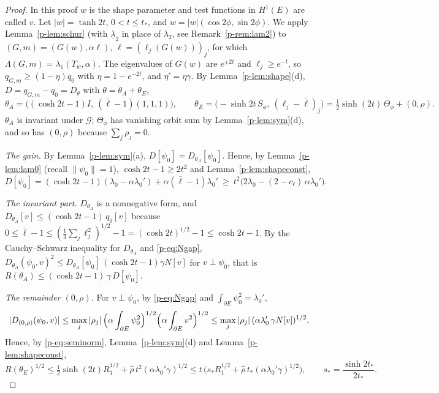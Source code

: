 \documentclass[11pt]{article}
\theoremstyle{remark}
\begin{document}
\begin{proof}
In this proof $w$ is the shape parameter and test functions in $H^1(E)$ are called $v$.
Let $|w|=\tanh2t$, $0<t\le t_*$, and $w=|w|(\cos2\phi,\sin2\phi)$. We apply
Lemma~\ref{p-lem:schur} (with $\underline\lambda_2$ in place of $\lambda_2$, see
Remark~\ref{p-rem:lam2}) to $(G,m)=(G(w),\alpha\ell)$, $\ell=(\ell_j(G(w)))_j$, for which
$\Lambda(G,m)=\lambda_1(T_w,\alpha)$. The eigenvalues of $G(w)$ are $e^{\pm2t}$ and
$\ell_j\ge e^{-t}$, so $q_{G,m}\ge(1-\eta)q_0$ with $\eta=1-e^{-2t}$, and $\eta'=\eta\gamma$.
By Lemma~\ref{p-lem:shape}(d), $D=q_{G,m}-q_0=D_\theta$ with $\theta=\theta_A+\theta_E$,
\[
  \theta_A=\bigl((\cosh2t-1)I,\ (\bar\ell-1)(1,1,1)\bigr),\qquad
  \theta_E=\bigl(-\sinh2t\,S_\phi,\ (\ell_j-\bar\ell)_j\bigr)
  =\tfrac12\sinh(2t)\,\Theta_\phi+(0,\rho).
\]
$\theta_A$ is invariant under $\mathcal G$; $\Theta_\phi$ has vanishing orbit sum by
Lemma~\ref{p-lem:sym}(d), and so has $(0,\rho)$ because $\sum_j\rho_j=0$.

\emph{The gain.} By Lemma~\ref{p-lem:sym}(a), $D[\psi_0]=D_{\theta_A}[\psi_0]$. Hence, by
Lemma~\ref{p-lem:lam0} (recall $\|\psi_0\|=1$), $\cosh2t-1\ge2t^2$ and Lemma~\ref{p-lem:shapeconst},
\begin{equation}\label{p-eq:gain}
  D[\psi_0]=(\cosh2t-1)(\lambda_0-\alpha\lambda_0')+\alpha(\bar\ell-1)\lambda_0'
  \ \ge\ t^2\bigl(2\lambda_0-(2-c_\ell)\,\alpha\lambda_0'\bigr).
\end{equation}

\emph{The invariant part.} $D_{\theta_A}$ is a nonnegative form, and
$D_{\theta_A}[v]\le(\cosh2t-1)\,q_0[v]$ because
$0\le\bar\ell-1\le(\frac13\sum_j\ell_j^2)^{1/2}-1=(\cosh2t)^{1/2}-1\le\cosh2t-1$. By the
Cauchy--Schwarz inequality for $D_{\theta_A}$ and \eqref{p-eq:Ngap},
$D_{\theta_A}(\psi_0,v)^2\le D_{\theta_A}[\psi_0]\,(\cosh2t-1)\gamma N[v]$ for $v\perp\psi_0$, that is
$R(\theta_A)\le(\cosh2t-1)\,\gamma\,D[\psi_0]$.

\emph{The remainder $(0,\rho)$.} For $v\perp\psi_0$, by \eqref{p-eq:Ngap} and
$\int_{\partial E}\psi_0^2=\lambda_0'$,
\[
  |D_{(0,\rho)}(\psi_0,v)|\le\max_j|\rho_j|\,\Bigl(\alpha\int_{\partial E}\psi_0^2\Bigr)^{1/2}
  \Bigl(\alpha\int_{\partial E}v^2\Bigr)^{1/2}\le\max_j|\rho_j|\,(\alpha\lambda_0'\,\gamma N[v])^{1/2}.
\]
Hence, by \eqref{p-eq:seminorm}, Lemma~\ref{p-lem:sym}(d) and Lemma~\ref{p-lem:shapeconst},
\[
  R(\theta_E)^{1/2}\le\tfrac12\sinh(2t)R_1^{1/2}+\hat\rho\,t^2(\alpha\lambda_0'\gamma)^{1/2}
  \le t\,\bigl(s_*R_1^{1/2}+\hat\rho\,t_*(\alpha\lambda_0'\gamma)^{1/2}\bigr),
  \qquad s_*=\frac{\sinh2t_*}{2t_*}.
\]


\end{proof}
\end{document}
